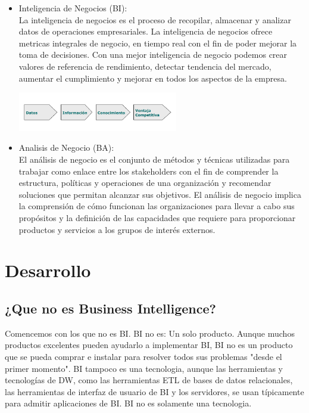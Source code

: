 \documentclass[twoside,twocolumn]{article}
\begin{document}
\begin{itemize}
\item Inteligencia de Negocios (BI): \\ 
La inteligencia de negocios es el proceso de recopilar, almacenar y analizar datos de operaciones empresariales. La inteligencia de negocios ofrece metricas integrales de negocio,
en tiempo real con el fin de poder mejorar la toma de decisiones. Con una mejor inteligencia de negocio podemos crear valores de referencia de rendimiento, detectar tendencia del mercado,
aumentar el cumplimiento y mejorar en todos los aspectos de la empresa.
\begin{center}
	\includegraphics[width=7cm]{./Imagenes/bi} 
\end{center}

\item Analisis de Negocio (BA): \\ 
El análisis de negocio es el conjunto de métodos y técnicas utilizadas para trabajar como enlace entre los stakeholders con el fin de comprender la estructura, políticas y operaciones de una organización y recomendar soluciones que permitan alcanzar sus objetivos. El análisis de negocio implica la comprensión de cómo funcionan las organizaciones para llevar a cabo sus propósitos y la definición de las capacidades que requiere para proporcionar productos y servicios a los grupos de interés externos.

\end{itemize}




\section{Desarrollo}

\subsection{¿Que no es Business Intelligence?}
Comencemos con los que no es BI. BI no es:
Un solo producto. Aunque muchos productos excelentes pueden ayudarlo a implementar BI, BI no es un producto que se pueda comprar e instalar para resolver todos sus problemas "desde el primer momento". BI tampoco es una tecnologia, aunque las herramientas y tecnologías de DW, como las herramientas ETL de bases de datos relacionales, las herramientas de interfaz de usuario de BI y los servidores, se usan típicamente para admitir aplicaciones de BI. BI no es solamente una tecnologia.
\end{document}
